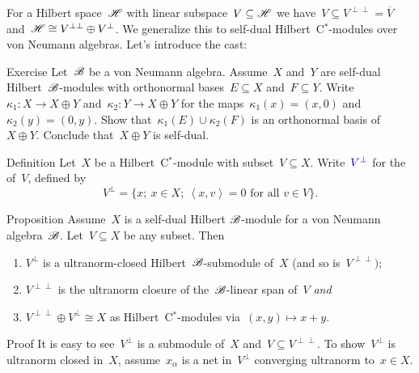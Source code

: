 \begin{parsec}%
\begin{point}%
For a Hilbert space~$\mathscr{H}$
    with linear subspace~$V \subseteq \mathscr{H}$
    we have~$V \subseteq V^{\perp\perp} = \overline{V}$
    and~$\mathscr{H} \cong V^{\perp\perp} \oplus  V^\perp$.
We generalize this to self-dual Hilbert~C$^*$-modules
    over von Neumann algebras.
Let's introduce the cast:
\end{point}
\begin{point}{Exercise}%
Let~$\mathscr{B}$ be a von Neumann algebra.
Assume~$X$ and~$Y$ are self-dual Hilbert~$\mathscr{B}$-modules
    with orthonormal bases~$E \subseteq X$ and~$F \subseteq Y$.
Write~$\kappa_1\colon X \to X \oplus Y$
    and~$\kappa_2 \colon Y \to X \oplus Y$
    for the maps~$\kappa_1(x) = (x,0)$ and~$\kappa_2(y) = (0, y)$.
Show that~$\kappa_1(E) \cup \kappa_2(F)$
    is an orthonormal basis of~$X \oplus Y$.
    Conclude that~$X \oplus Y$ is self-dual.
\end{point}
\begin{point}{Definition}%
Let~$X$ be a Hilbert~C$^*$-module
    with subset~$V \subseteq X$.
    Write~$\Define{V^\perp}$ for the 
    of~$V$, defined by
\begin{equation*}
    V^\perp = \{ x; \ x \in X;\ \left<x,v\right>=0\text{ for all }v\in V\}.
\end{equation*}
\end{point}
\begin{point}{Proposition}%
Assume~$X$ is a self-dual Hilbert $\mathscr{B}$-module
    for a von Neumann algebra~$\mathscr{B}$.
Let~$V \subseteq X$ be any subset. Then
\begin{enumerate}
\item
$V^\perp$ is a ultranorm-closed Hilbert~$\mathscr{B}$-submodule of~$X$
    (and so is~$V^{\perp\perp})$;
\item
    $V^{\perp\perp}$ is the ultranorm closure of the~$\mathscr{B}$-linear
    span of~$V$ \emph{and}
\item
    $V^{\perp\perp} \oplus V^\perp \cong X$ as Hilbert~C$^*$-modules
        via~$(x,y) \mapsto x+y$.
\end{enumerate}
\begin{point}{Proof}%
It is easy to see~$V^\perp$ is a submodule of~$X$
    and~$V \subseteq V^{\perp\perp}$.
To show~$V^\perp$ is ultranorm closed in~$X$,
    assume~$x_\alpha$ is a net in~$V^\perp$
    converging ultranorm to~$x \in X$.

\end{point}
\end{point}
\end{parsec}
